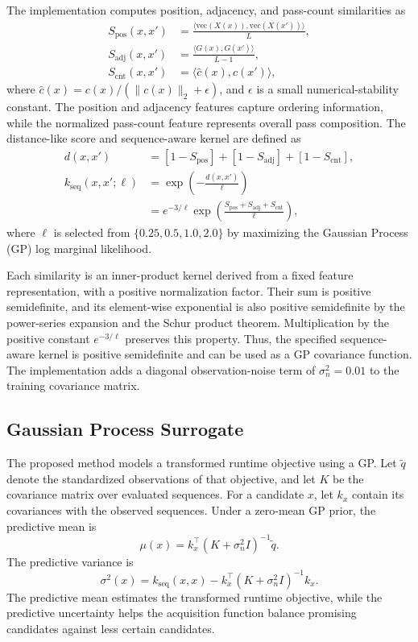 The implementation computes position, adjacency, and pass-count similarities as
\begin{align}
S_{\mathrm{pos}}(x,x') &= \frac{\langle \mathrm{vec}(X(x)), \mathrm{vec}(X(x'))\rangle}{L}, \\
S_{\mathrm{adj}}(x,x') &= \frac{\langle G(x), G(x')\rangle}{L-1}, \\
S_{\mathrm{cnt}}(x,x') &= \langle \hat{c}(x), \hat{c}(x')\rangle,
\end{align}
where $\hat{c}(x) = c(x)/(\lVert c(x)\rVert_2 + \epsilon)$, and $\epsilon$ is a small numerical-stability constant. The position and adjacency features capture ordering information, while the normalized pass-count feature represents overall pass composition. The distance-like score and sequence-aware kernel are defined as
\begin{align}
d(x,x') &= [1 - S_{\mathrm{pos}}] + [1 - S_{\mathrm{adj}}] + [1 - S_{\mathrm{cnt}}], \\
k_{\mathrm{seq}}(x,x';\ell) &= \exp\!\left(-\frac{d(x,x')}{\ell}\right) \\
&= e^{-3/\ell}\exp\!\left(\frac{S_{\mathrm{pos}}+S_{\mathrm{adj}}+S_{\mathrm{cnt}}}{\ell}\right),
\end{align}
where $\ell$ is selected from $\{0.25, 0.5, 1.0, 2.0\}$ by maximizing the Gaussian Process (GP) log marginal likelihood.

Each similarity is an inner-product kernel derived from a fixed feature representation, with a positive normalization factor. Their sum is positive semidefinite, and its element-wise exponential is also positive semidefinite by the power-series expansion and the Schur product theorem. Multiplication by the positive constant $e^{-3/\ell}$ preserves this property. Thus, the specified sequence-aware kernel is positive semidefinite and can be used as a GP covariance function. The implementation adds a diagonal observation-noise term of $\sigma_n^2 = 0.01$ to the training covariance matrix.

\subsection{Gaussian Process Surrogate}
The proposed method models a transformed runtime objective using a GP. Let $\tilde{q}$ denote the standardized observations of that objective, and let $K$ be the covariance matrix over evaluated sequences. For a candidate $x$, let $k_x$ contain its covariances with the observed sequences. Under a zero-mean GP prior, the predictive mean is
\begin{equation}
\mu(x) = k_x^{\top}(K + \sigma_n^2 I)^{-1}\tilde{q}.
\end{equation}
The predictive variance is
\begin{equation}
\sigma^2(x) = k_{\mathrm{seq}}(x,x) - k_x^{\top}(K + \sigma_n^2 I)^{-1}k_x.
\end{equation}
The predictive mean estimates the transformed runtime objective, while the predictive uncertainty helps the acquisition function balance promising candidates against less certain candidates.

